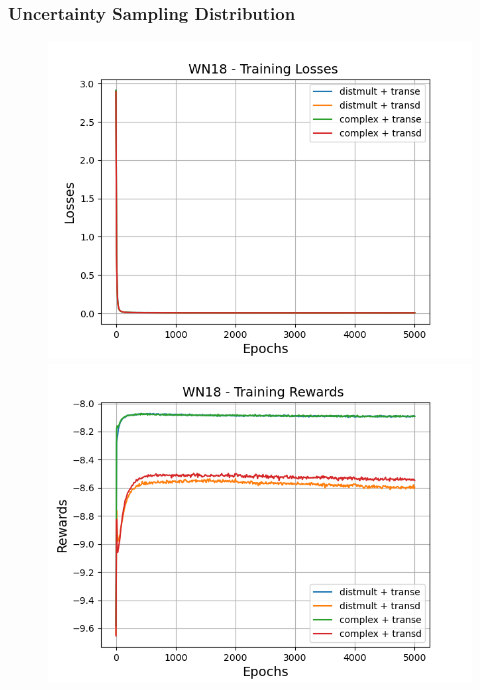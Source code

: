 \subsubsection{Uncertainty Sampling Distribution}

\begin{figure}
    \centering
    \begin{minipage}{.5\textwidth}
      \centering
      \includegraphics[width=0.9\linewidth]{figures/results/gan_train/not_pretrained/uncertainty/max_distribution/entropy/wn18/gan_train_uncertainty_wn18_losses.png}
    \end{minipage}%
    \begin{minipage}{.5\textwidth}
      \centering
      \includegraphics[width=0.9\linewidth]{figures/results/gan_train/not_pretrained/uncertainty/max_distribution/entropy/wn18/gan_train_uncertainty_wn18_rewards.png}
    \end{minipage}

\end{figure}
